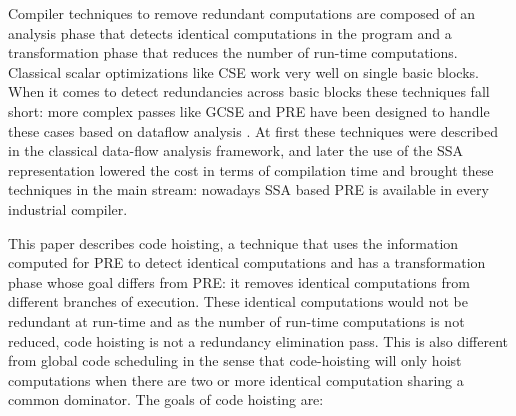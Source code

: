 \documentclass{sig-alternate}
\begin{document}
Compiler techniques to remove redundant computations are composed of an analysis
phase that detects identical computations in the program and a transformation
phase that reduces the number of run-time computations.  Classical scalar
optimizations like CSE \cite{dragonbook} work very well on single basic blocks.
When it comes to detect redundancies across basic blocks these techniques fall
short: more complex passes like GCSE and PRE have been designed to handle these
cases based on dataflow analysis \cite{morel1979global}.  At first these
techniques were described in the classical data-flow analysis framework, and
later the use of the SSA representation lowered the cost in terms of compilation
time \cite{briggs1994effective,chow1997new,kennedy1999partial} and brought these
techniques in the main stream: nowadays SSA based PRE is available in every
industrial compiler.

This paper describes code hoisting, a technique that uses the information
computed for PRE to detect identical computations and has a transformation phase
whose goal differs from PRE: it removes identical computations from different
branches of execution.  These identical computations would not be redundant at
run-time and as the number of run-time computations is not reduced, code
hoisting is not a redundancy elimination pass. This is also different from
global code scheduling \cite{dragonbook} in the sense that code-hoisting will
only hoist computations when there are two or more identical computation sharing
a common dominator. The goals of code hoisting are:
\end{document}
